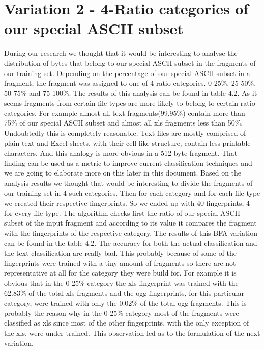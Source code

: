 \section{Variation 2 - 4-Ratio categories of our special ASCII subset}
During our research we thought that it would be interesting to analyse the distribution of bytes that belong to our special ASCII subset in the fragments of our training set. Depending on the percentage of our special ASCII subset in a fragment, the fragment was assigned to one of 4 ratio categories. 0-25\%, 25-50\%, 50-75\% and 75-100\%. The results of this analysis can be found in table 4.2. As it seems fragments from certain file types are more likely to belong to certain ratio categories. For example almost all text fragments(99.95\%) contain more than 75\% of our special ASCII subset and almost all xls fragments less than 50\%. Undoubtedly this is completely reasonable. Text files are mostly comprised of plain text and Excel sheets, with their cell-like structure, contain less printable characters. And this analogy is more obvious in a 512-byte fragment. That finding can be used as a metric to improve current classification techniques and we are going to elaborate more on this later in this document.
Based on the analysis results  we thought that would be interesting to divide the fragments of our training set in 4 such categories. Then for each category and for each file type we created their respective fingerprints. So we ended up with 40 fingerprints, 4 for every file type. The algorithm checks first the ratio of our special ASCII subset of the input fragment and according to its value it compares the fragment with the fingerprints of the respective category. The results of this BFA variation can be found in the table 4.2. The accuracy for both the actual classification and the text classification are really bad. This probably because of some of the fingerprints were trained with a tiny amount of fragments so there are not representative at all for the category they were build for. For example it is obvious that in the 0-25\% category the xls fingerprint was trained with the 62.83\% of the total xls fragments and the ogg fingerprints, for this particular category, were trained with only the 0.02\% of the total ogg fragments. This is probably the reason why in the 0-25\% category most of the fragments were classified as xls since most of the other fingerprints, with the only exception of the xls, were under-trained. This observation led as to the formulation of the next variation.

